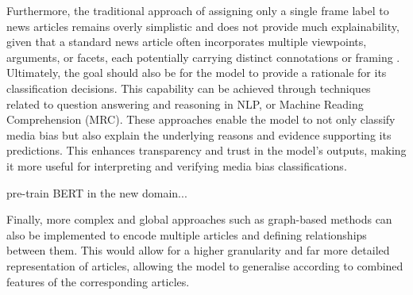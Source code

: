 Furthermore, the traditional approach of assigning only a single frame label to news articles remains overly simplistic and does not provide much explainability, given that a standard news article often incorporates multiple viewpoints, arguments, or facets, each potentially carrying distinct connotations or framing \cite{vallejo-2023-connecting}. Ultimately, the goal should also be for the model to provide a rationale for its classification decisions. This capability can be achieved through techniques related to question answering and reasoning in NLP, or Machine Reading Comprehension (MRC). These approaches enable the model to not only classify media bias but also explain the underlying reasons and evidence supporting its predictions. This enhances transparency and trust in the model's outputs, making it more useful for interpreting and verifying media bias classifications.


pre-train BERT in the new domain...

Finally, more complex and global approaches such as graph-based methods can also be implemented to encode multiple articles and defining relationships between them. This would allow for a higher granularity and far more detailed representation of articles, allowing the model to generalise according to combined features of the corresponding articles.

